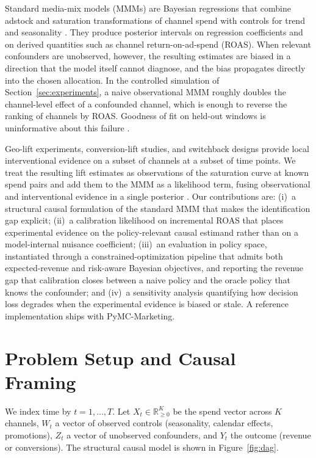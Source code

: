 \documentclass{uai2026} %
\begin{document}
Standard media-mix models (MMMs) are Bayesian regressions that combine adstock and saturation transformations of channel spend with controls for trend and seasonality \citep{jin2017bayesian,salvatier2016pymc,pymcmarketing2024}.
They produce posterior intervals on regression coefficients and on derived quantities such as channel return-on-ad-spend (ROAS).
When relevant confounders are unobserved, however, the resulting estimates are biased in a direction that the model itself cannot diagnose, and the bias propagates directly into the chosen allocation.
In the controlled simulation of Section~\ref{sec:experiments}, a naive observational MMM roughly doubles the channel-level effect of a confounded channel, which is enough to reverse the ranking of channels by ROAS.
Goodness of fit on held-out windows is uninformative about this failure \citep{vincent2026goodnessfit,orduz2026nor2}.

Geo-lift experiments, conversion-lift studies, and switchback designs provide local interventional evidence on a subset of channels at a subset of time points.
We treat the resulting lift estimates as observations of the saturation curve at known spend pairs and add them to the MMM as a likelihood term, fusing observational and interventional evidence in a single posterior \citep{bareinboim2016causal,colnet2024causal}.
Our contributions are:
(i)~a structural causal formulation of the standard MMM that makes the identification gap explicit;
(ii)~a calibration likelihood on incremental ROAS that places experimental evidence on the policy-relevant causal estimand rather than on a model-internal nuisance coefficient;
(iii)~an evaluation in policy space, instantiated through a constrained-optimization pipeline that admits both expected-revenue and risk-aware Bayesian objectives, and reporting the revenue gap that calibration closes between a naive policy and the oracle policy that knows the confounder; and
(iv)~a sensitivity analysis quantifying how decision loss degrades when the experimental evidence is biased or stale.
A reference implementation ships with PyMC-Marketing.

\section{Problem Setup and Causal Framing}\label{sec:setup}

We index time by $t = 1,\dots,T$.
Let $X_t \in \mathbb{R}_{\ge 0}^K$ be the spend vector across $K$ channels, $W_t$ a vector of observed controls (seasonality, calendar effects, promotions), $Z_t$ a vector of unobserved confounders, and $Y_t$ the outcome (revenue or conversions).
The structural causal model is shown in Figure~\ref{fig:dag}.
\end{document}
